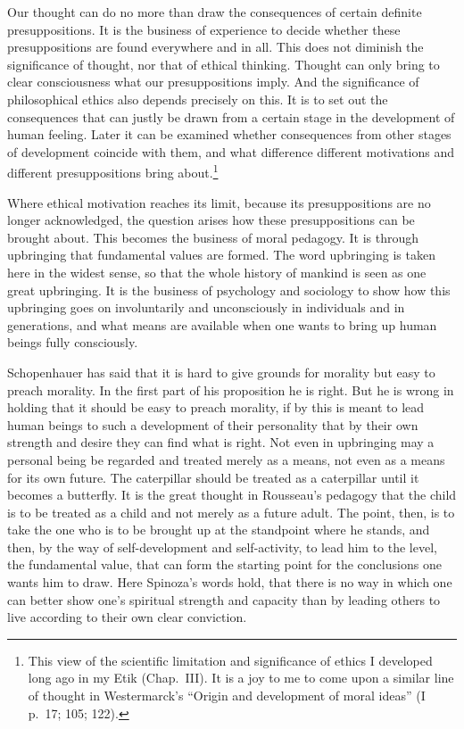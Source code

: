 \documentclass[12pt]{article}
\newcommand{\opage}[1]{\marginnote{\footnotesize\textit{[#1]}}}
\begin{document}
Our thought can do no more than draw the consequences of certain definite
presuppositions. It is the business of experience to decide whether these
presuppositions are found everywhere and in all. This does not diminish the
significance of thought, nor that of ethical thinking. Thought can only bring to
clear consciousness what our
\opage{54}%
presuppositions imply. And the significance of philosophical ethics also depends
precisely on this. It is to set out the consequences that can justly be drawn
from a certain stage in the development of human feeling. Later it can be
examined whether consequences from other stages of development coincide with
them, and what difference different motivations and different presuppositions
bring about.\footnote{This view of the scientific limitation and significance
of ethics I developed long ago in my Etik (Chap.~III). It is a joy to me to come
upon a similar line of thought in Westermarck's ``Origin and development of moral
ideas'' (I p.~17; 105; 122).}

Where ethical motivation reaches its limit, because its presuppositions are no
longer acknowledged, the question arises how these presuppositions can be
brought about. This becomes the business of moral pedagogy. It is through
upbringing that fundamental values are formed. The word upbringing is taken here
in the widest sense, so that the whole history of mankind is seen as one great
upbringing. It is the business of psychology and sociology to show how this
upbringing goes on involuntarily and unconsciously in individuals and in
generations, and
\opage{55}%
what means are available when one wants to bring up human beings fully
consciously.

Schopenhauer has said that it is hard to give grounds for morality but easy to
preach morality. In the first part of his proposition he is right. But he is
wrong in holding that it should be easy to preach morality, if by this is meant
to lead human beings to such a development of their personality that by their
own strength and desire they can find what is right. Not even in upbringing may a
personal being be regarded and treated merely as a means, not even as a means
for its own future. The caterpillar should be treated as a caterpillar until it
becomes a butterfly. It is the great thought in Rousseau's pedagogy that the
child is to be treated as a child and not merely as a future adult. The point,
then, is to take the one who is to be brought up at the standpoint where he
stands, and then, by the way of self-development and self-activity, to lead him
to the level, the fundamental value, that can form the starting point for the
conclusions one wants him to draw. Here Spinoza's words hold, that there is no
way in which one can better show one's spiritual strength and capacity than by
leading others
\opage{56}%
to live according to their own clear conviction.
\end{document}

